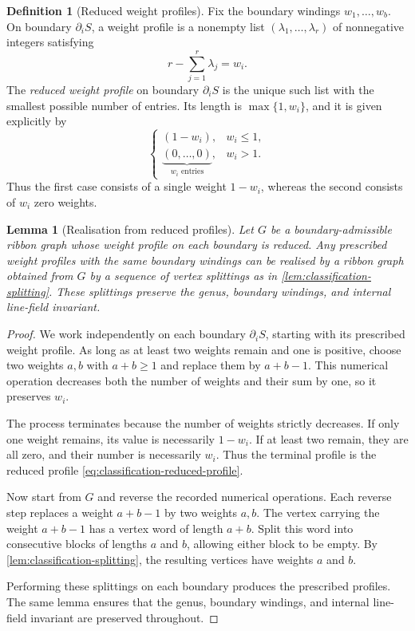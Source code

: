 \documentclass[11pt]{amsart}
\theoremstyle{definition}
\theoremstyle{plain}
\newtheorem{lemma}[lemma]{Lemma}
\theoremstyle{definition}
\newtheorem{definition}[definition]{Definition}
\theoremstyle{definition}
\begin{document}
\begin{definition}[Reduced weight profiles]
\label{def:classification-reduced-profiles}
Fix the boundary windings $w_1,\ldots,w_b$.
On boundary $\partial_i S$, a weight profile is a nonempty list
$(\lambda_1,\ldots,\lambda_r)$ of nonnegative integers
satisfying
\[
 r-\sum_{j=1}^r\lambda_j=w_i.
\]
The \emph{reduced weight profile} on boundary $\partial_iS$ is
the unique such list with the smallest possible number
of entries. Its length is $\max\{1,w_i\}$, and it is
given explicitly by
\begin{equation}
\label{eq:classification-reduced-profile}
 \begin{cases}
  (1-w_i),&w_i\leq1,\\[2pt]
  \underbrace{(0,\ldots,0)}_{w_i\text{ entries}},&w_i>1.
 \end{cases}
\end{equation}
Thus the first case consists of a single weight $1-w_i$,
whereas the second consists of $w_i$ zero weights.
\end{definition}



\begin{lemma}[Realisation from reduced profiles]
\label{lem:classification-profiles}
Let $G$ be a boundary-admissible ribbon graph whose weight
profile on each boundary is reduced.
Any prescribed weight profiles with the same boundary
windings can be realised by a ribbon graph obtained
from $G$ by a sequence of vertex splittings as in
\cref{lem:classification-splitting}.
These splittings preserve the genus, boundary windings,
and internal line-field invariant.
\end{lemma}

\begin{proof}
We work independently on each boundary $\partial_i S$, starting
with its prescribed weight profile.
As long as at least two weights remain and one is
positive, choose two weights $a,b$ with $a+b\geq1$
and replace them by $a+b-1$.
This numerical operation decreases both the number
of weights and their sum by one, so it preserves $w_i$.

The process terminates because the number of weights
strictly decreases. If only one weight remains, its
value is necessarily $1-w_i$. If at least two remain,
they are all zero, and their number is necessarily $w_i$.
Thus the terminal profile is the reduced profile
\eqref{eq:classification-reduced-profile}.

Now start from $G$ and reverse the recorded numerical
operations. Each reverse step replaces a weight
$a+b-1$ by two weights $a,b$.
The vertex carrying the weight $a+b-1$ has a vertex
word of length $a+b$. Split this word into consecutive
blocks of lengths $a$ and $b$, allowing either block
to be empty. By \cref{lem:classification-splitting},
the resulting vertices have weights $a$ and $b$.

Performing these splittings on each boundary produces
the prescribed profiles. The same lemma ensures that
the genus, boundary windings, and internal line-field
invariant are preserved throughout.
\end{proof}
\end{document}
